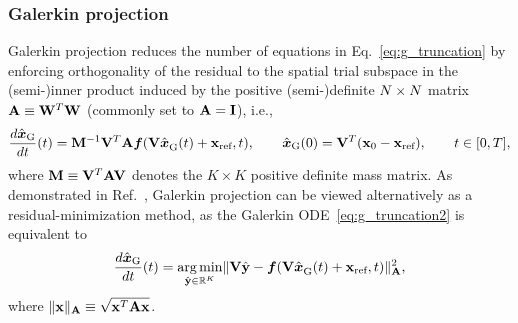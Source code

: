 \documentclass[3p,computermodern,10pt]{elsarticle}
\begin{document}
\subsubsection{Galerkin projection}
Galerkin projection reduces the number of equations in
Eq.~\eqref{eq:g_truncation} by enforcing orthogonality of the 
residual to the spatial trial subspace in the (semi-)inner product induced by the 
positive (semi-)definite $\fomdim\times\fomdim$ matrix $\stweightingMatArg{}\equiv \stweightingMatOneArg{ }^T
\stweightingMatOneArg{ }$ (commonly set to
$\stweightingMatArg{}=\mathbf{I}$), i.e.,
\begin{equation}\label{eq:g_truncation2}
\frac{d\genstateGalerkin}{dt}(t)= \massArgnt{n}^{-1} \basisspace^T \stweightingMatArg{n} \velocity(\basisspace
\genstateGalerkinArg{}{t} + \stateIntercept,t), \qquad \genstateGalerkin(0) = \genstateIC, \qquad t \in [0,T],
\end{equation}
where $\massArgnt{ } \equiv \basisspace^T \stweightingMatArg{ } \basisspace$
denotes the $K\times K$ positive definite mass matrix.
As demonstrated in Ref.~\cite{carlberg_lspg_v_galerkin}, Galerkin projection
can be viewed alternatively as a residual-minimization
method, as the Galerkin ODE~\eqref{eq:g_truncation2} is equivalent
to
\begin{equation}\label{eq:GalOptimal}
\frac{d\genstateGalerkin}{dt}(t) = \underset{ \genstateyDiscrete \in \RR{\romdim}
	}{\text{arg\,min}} \| \basisspace \hat{\stateyDiscrete} -
	\velocity(\basisspace \genstateGalerkinArg{}{t} + \stateIntercept,t)
	\|_{\stweightingMatArg{n}}^2,
\end{equation}
where $\|\mathbf{x}\|_{\stweightingMatArg{n}}\equiv
\sqrt{\mathbf{x}^T\stweightingMatArg{n}\mathbf{x}}$.
\end{document}

